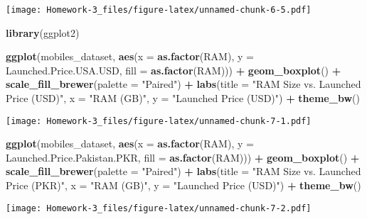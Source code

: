 \documentclass[
]{article}
\newenvironment{Shaded}{\begin{snugshade}}{\end{snugshade}}
\newcommand{\AttributeTok}[1]{\textcolor[rgb]{0.13,0.29,0.53}{#1}}
\newcommand{\FunctionTok}[1]{\textcolor[rgb]{0.13,0.29,0.53}{\textbf{#1}}}
\newcommand{\NormalTok}[1]{#1}
\newcommand{\SpecialCharTok}[1]{\textcolor[rgb]{0.81,0.36,0.00}{\textbf{#1}}}
\newcommand{\StringTok}[1]{\textcolor[rgb]{0.31,0.60,0.02}{#1}}
\begin{document}
\texttt{[image: Homework-3\_files/figure-latex/unnamed-chunk-6-5.pdf]}

\begin{Shaded}
\begin{Highlighting}[]
\FunctionTok{library}\NormalTok{(ggplot2)}

\FunctionTok{ggplot}\NormalTok{(mobiles\_dataset, }\FunctionTok{aes}\NormalTok{(}\AttributeTok{x =} \FunctionTok{as.factor}\NormalTok{(RAM), }\AttributeTok{y =}\NormalTok{ Launched.Price.USA.USD, }\AttributeTok{fill =} \FunctionTok{as.factor}\NormalTok{(RAM))) }\SpecialCharTok{+}
  \FunctionTok{geom\_boxplot}\NormalTok{() }\SpecialCharTok{+}
  \FunctionTok{scale\_fill\_brewer}\NormalTok{(}\AttributeTok{palette =} \StringTok{"Paired"}\NormalTok{) }\SpecialCharTok{+}
  \FunctionTok{labs}\NormalTok{(}\AttributeTok{title =} \StringTok{"RAM Size vs. Launched Price (USD)"}\NormalTok{,}
       \AttributeTok{x =} \StringTok{"RAM (GB)"}\NormalTok{,}
       \AttributeTok{y =} \StringTok{"Launched Price (USD)"}\NormalTok{) }\SpecialCharTok{+}
  \FunctionTok{theme\_bw}\NormalTok{()}
\end{Highlighting}
\end{Shaded}

\texttt{[image: Homework-3\_files/figure-latex/unnamed-chunk-7-1.pdf]}

\begin{Shaded}
\begin{Highlighting}[]
\FunctionTok{ggplot}\NormalTok{(mobiles\_dataset, }\FunctionTok{aes}\NormalTok{(}\AttributeTok{x =} \FunctionTok{as.factor}\NormalTok{(RAM), }\AttributeTok{y =}\NormalTok{ Launched.Price.Pakistan.PKR, }\AttributeTok{fill =} \FunctionTok{as.factor}\NormalTok{(RAM))) }\SpecialCharTok{+}
  \FunctionTok{geom\_boxplot}\NormalTok{() }\SpecialCharTok{+}
  \FunctionTok{scale\_fill\_brewer}\NormalTok{(}\AttributeTok{palette =} \StringTok{"Paired"}\NormalTok{) }\SpecialCharTok{+}
  \FunctionTok{labs}\NormalTok{(}\AttributeTok{title =} \StringTok{"RAM Size vs. Launched Price (PKR)"}\NormalTok{,}
       \AttributeTok{x =} \StringTok{"RAM (GB)"}\NormalTok{,}
       \AttributeTok{y =} \StringTok{"Launched Price (USD)"}\NormalTok{) }\SpecialCharTok{+}  
  \FunctionTok{theme\_bw}\NormalTok{()}
\end{Highlighting}
\end{Shaded}

\texttt{[image: Homework-3\_files/figure-latex/unnamed-chunk-7-2.pdf]}
\end{document}
